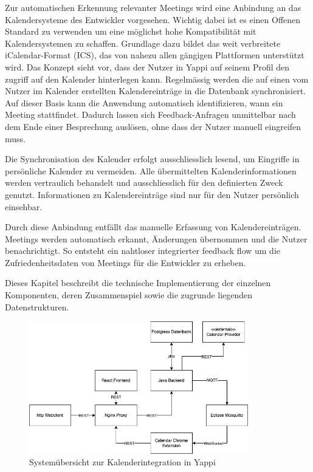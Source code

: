 \documentclass[12pt,a4paper]{report}
\begin{document}
        Zur automatischen Erkennung relevanter Meetings wird eine Anbindung an das Kalendersysteme des Entwickler vorgesehen.
        Wichtig dabei ist es einen Offenen Standard zu verwenden um eine möglichst hohe Kompatibilität mit Kalendersystemen zu schaffen.
        Grundlage dazu bildet das weit verbreitete iCalendar-Format (ICS), das von nahezu allen gängigen Plattformen unterstützt wird.
        Das Konzept sieht vor, dass der Nutzer in Yappi auf seinem Profil den zugriff auf den Kalender hinterlegen kann.
        Regelmässig werden die auf einen vom Nutzer im Kalender erstellten Kalendereinträge in die Datenbank synchronisiert.
        Auf dieser Basis kann die Anwendung automatisch identifizieren, wann ein Meeting stattfindet.
        Dadurch lassen sich Feedback-Anfragen unmittelbar nach dem Ende einer Besprechung auslösen, ohne dass der Nutzer manuell eingreifen muss.

        Die Synchronisation des Kalender erfolgt ausschliesslich lesend, um Eingriffe in persönliche Kalender zu vermeiden.
        Alle übermittelten Kalenderinformationen werden vertraulich behandelt und ausschliesslich für den definierten Zweck genutzt.
        Informationen zu Kalendereinträge sind nur für den Nutzer persönlich einsehbar.

        Durch diese Anbindung entfällt das manuelle Erfassung von Kalendereinträgen. Meetings werden automatisch erkannt,
        Änderungen übernommen und die Nutzer benachrichtigt. So entsteht ein nahtloser integrierter feedback flow um die
        Zufriedenheitsdaten von Meetings für die Entwickler zu erheben.

        Dieses Kapitel beschreibt die technische Implementierung der einzelnen Komponenten, deren Zusammenspiel
        sowie die zugrunde liegenden Datenstrukturen.


        \begin{figure}[H]
          \centering
          \includegraphics[width=0.85\textwidth]{../figures/implementation-claendar-companion-system.drawio.png}
          \caption{Systemübersicht zur Kalenderintegration in Yappi}
          \label{fig:implementation-calendar-companion-system}
        \end{figure}
\end{document}

